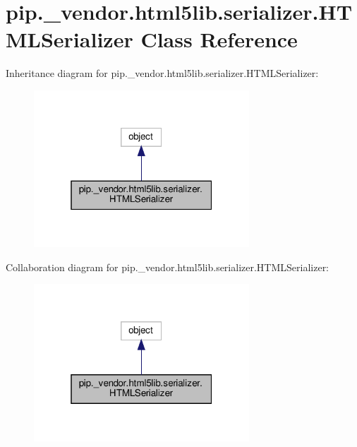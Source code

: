 \hypertarget{classpip_1_1__vendor_1_1html5lib_1_1serializer_1_1HTMLSerializer}{}\section{pip.\+\_\+vendor.\+html5lib.\+serializer.\+H\+T\+M\+L\+Serializer Class Reference}
\label{classpip_1_1__vendor_1_1html5lib_1_1serializer_1_1HTMLSerializer}


Inheritance diagram for pip.\+\_\+vendor.\+html5lib.\+serializer.\+H\+T\+M\+L\+Serializer\+:
\nopagebreak
\begin{figure}[H]
\begin{center}
\leavevmode
\includegraphics[width=229pt]{classpip_1_1__vendor_1_1html5lib_1_1serializer_1_1HTMLSerializer__inherit__graph}
\end{center}
\end{figure}


Collaboration diagram for pip.\+\_\+vendor.\+html5lib.\+serializer.\+H\+T\+M\+L\+Serializer\+:
\nopagebreak
\begin{figure}[H]
\begin{center}
\leavevmode
\includegraphics[width=229pt]{classpip_1_1__vendor_1_1html5lib_1_1serializer_1_1HTMLSerializer__coll__graph}
\end{center}
\end{figure}
